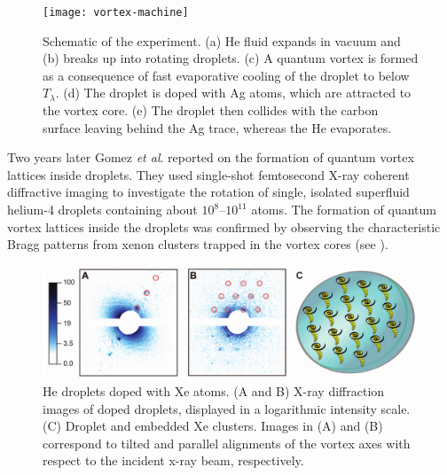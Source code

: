 	\begin{figure}[t]
		\begin{center}
			\texttt{[image: vortex-machine]}
			\caption{Schematic of the experiment. (a) He fluid expands in vacuum and (b) breaks up into rotating droplets. (c) A quantum vortex is formed as a consequence of fast evaporative cooling of the droplet to below $T_\lambda$. (d) The droplet is doped with Ag atoms, which are attracted to the vortex core. (e) The droplet then collides with the carbon surface leaving behind the Ag trace, whereas the He evaporates.}
			\label{fig:vortex-machine}
		\end{center}
	\end{figure}	
	
	Two years later Gomez \emph{et al}. reported\citep{Gom14} on the formation of quantum vortex lattices inside droplets. They used single-shot femtosecond X-ray coherent diffractive imaging to investigate the rotation of single, isolated superfluid helium-4 droplets containing about $10^8$--$10^{11}$ atoms. The formation of quantum vortex lattices inside the droplets was confirmed by observing the characteristic Bragg patterns from xenon clusters trapped in the vortex cores (see ).

	\begin{figure}[t]
		\begin{center}
			\includegraphics[width=\textwidth]{vortex-array}
			\caption{He droplets doped with Xe atoms. (A and B) X-ray diffraction images of doped droplets, displayed in a logarithmic intensity scale. (C) Droplet and embedded Xe clusters. Images in (A) and (B) correspond to tilted and parallel alignments of the vortex axes with respect to the incident x-ray beam, respectively.}
			\label{fig:vortex-array}
		\end{center}
	\end{figure}
\clearpage{\pagestyle{empty}\cleardoublepage}